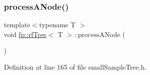 \subsubsection{\texorpdfstring{process\+A\+Node()}{processANode()}\hspace{0.1cm}{\footnotesize\ttfamily [2/2]}}
{\footnotesize\ttfamily template$<$typename T $>$ \\
void \hyperlink{classfp_1_1rfTree}{fp\+::rf\+Tree}$<$ T $>$\+::process\+A\+Node (\begin{DoxyParamCaption}{ }\end{DoxyParamCaption})\hspace{0.3cm}{\ttfamily [inline]}}



Definition at line 165 of file small\+Sample\+Tree.\+h.


